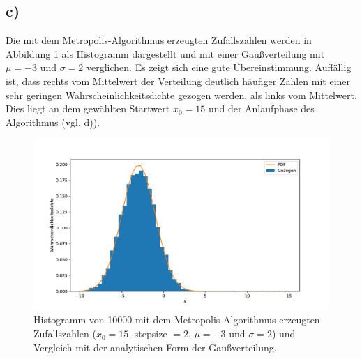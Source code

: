 \documentclass[a4paper, 11pt]{article}
\begin{document}
\subsection*{c)}
Die mit dem Metropolis-Algorithmus erzeugten Zufallszahlen werden in Abbildung
\ref{fig:metropolis-hist} als Histogramm dargestellt und mit einer Gaußverteilung
mit $\mu = -3$ und $\sigma=2$ verglichen. Es zeigt sich eine gute Übereinstimmung.
Auffällig ist, dass rechts vom Mittelwert der Verteilung deutlich häufiger
Zahlen mit einer sehr geringen Wahrscheinlichkeitsdichte gezogen werden, als
links vom Mittelwert. Dies liegt an dem gewählten Startwert $x_0=15$ und der
Anlaufphase des Algorithmus (vgl. d)).
\begin{figure}
  \centering
  \includegraphics[width=\textwidth]{../A15/A15c}
  \caption{Histogramm von 10000 mit dem Metropolis-Algorithmus erzeugten
  Zufallszahlen ($x_0=15$, stepsize $=2$, $\mu = -3$ und $\sigma=2$) und Vergleich
  mit der analytischen Form der Gaußverteilung.}
  \label{fig:metropolis-hist}
\end{figure}
\end{document}
